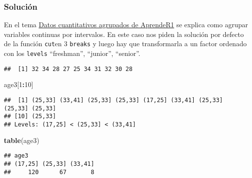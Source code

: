 \documentclass[
]{article}
\newenvironment{Shaded}{\begin{snugshade}}{\end{snugshade}}
\newcommand{\CommentTok}[1]{\textcolor[rgb]{0.56,0.35,0.01}{\textit{#1}}}
\newcommand{\DataTypeTok}[1]{\textcolor[rgb]{0.13,0.29,0.53}{#1}}
\newcommand{\DecValTok}[1]{\textcolor[rgb]{0.00,0.00,0.81}{#1}}
\newcommand{\KeywordTok}[1]{\textcolor[rgb]{0.13,0.29,0.53}{\textbf{#1}}}
\newcommand{\NormalTok}[1]{#1}
\newcommand{\OperatorTok}[1]{\textcolor[rgb]{0.81,0.36,0.00}{\textbf{#1}}}
\begin{document}
\hypertarget{soluciuxf3n-4}{%
\subsubsection{Solución}\label{soluciuxf3n-4}}

En el tema
\href{https://aprender-uib.github.io/AprendeR1/chap-hist.html}{Datos
cuantitativos agrupados de AprendeR1} se explica como agrupar variables
continuas por intervalos. En este caso nos piden la solución por defecto
de la función \texttt{cut}en 3 \texttt{breaks} y luego hay que
transformarla a un factor ordenado con los \texttt{levels} ``freshman'',
``junior'', ``senior''.

\begin{Shaded}
\end{Shaded}

\begin{verbatim}
##  [1] 32 34 28 27 25 34 31 32 30 28
\end{verbatim}

\begin{Shaded}
\begin{Highlighting}[]
\NormalTok{age3[}\DecValTok{1}\OperatorTok{:}\DecValTok{10}\NormalTok{]}
\end{Highlighting}
\end{Shaded}

\begin{verbatim}
##  [1] (25,33] (33,41] (25,33] (25,33] (17,25] (33,41] (25,33] (25,33] (25,33]
## [10] (25,33]
## Levels: (17,25] < (25,33] < (33,41]
\end{verbatim}

\begin{Shaded}
\begin{Highlighting}[]
\KeywordTok{table}\NormalTok{(age3)}
\end{Highlighting}
\end{Shaded}

\begin{verbatim}
## age3
## (17,25] (25,33] (33,41] 
##     120      67       8
\end{verbatim}
\end{document}
